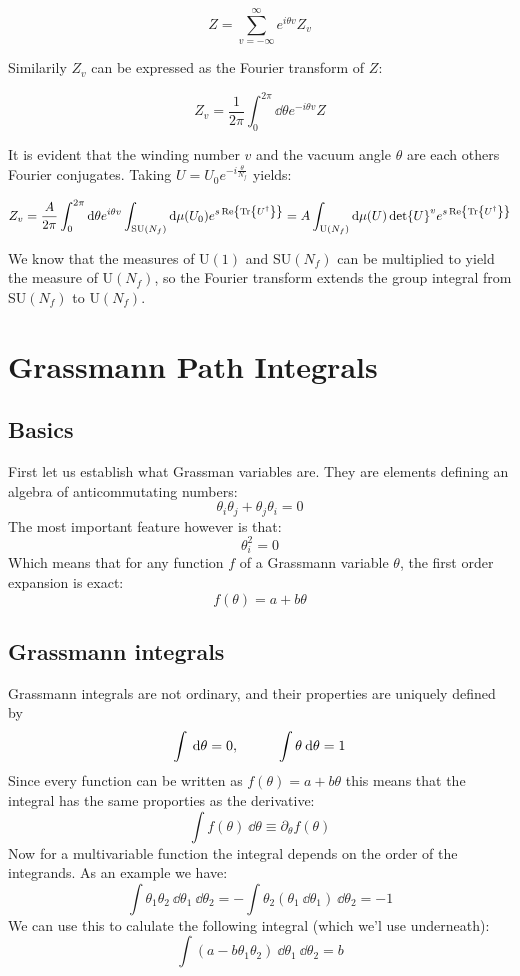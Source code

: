 \documentclass[a4,10pt,titlepage]{article}
\renewcommand\[{\begin{equation*}}
\renewcommand\]{\end{equation*}}
\newcommand{\be}{\begin{equation}}
\newcommand{\ee}{\end{equation}}
\numberwithin{equation}{section}
\newcommand{\lp}{\left}
\newcommand{\rp}{\right}
\begin{document}
\be
Z=\sum_{v=-\infty}^{\infty}e^{i\theta v}Z_v
\ee

Similarily $Z_v$ can be expressed as the Fourier transform of $Z$:

\be
Z_v=\frac{1}{2\pi}\int_0^{2\pi}\dd\theta e^{-i\theta v}Z
\ee

It is evident that the winding number $v$ and the vacuum angle $\theta$ are each others Fourier conjugates. Taking $U=U_0 e^{-i\frac{\theta}{N_f}}$ yields:

\be
Z_v=\frac{A}{2\pi}\int_0^{2\pi}\dd\theta e^{i\theta v}\int_{\text{SU}(N_f)}\dd\mu(U_0)e^{s\Re{\Tr{U^\dagger}}}=A\int_{\text{U}(N_f)}\dd\mu(U)\det{U}^v e^{s\Re{\Tr{U^\dagger}}}
\ee

We know that the measures of U$(1)$ and SU$(N_f)$ can be multiplied to yield the measure of U$(N_f)$, so the Fourier transform extends the group integral from SU$(N_f)$ to U$(N_f)$.
\section{Grassmann Path Integrals}
\subsection{Basics}
First let us establish what Grassman variables are. They are elements defining an algebra of anticommutating numbers:
\be
\theta_i\theta_j+\theta_j\theta_i=0
\ee
The most important feature however is that:
\be
\theta_i^2=0
\ee
Which means that for any function $f$ of a Grassmann variable $\theta$, the first order expansion is exact:
\be
f(\theta)=a+b\theta
\ee
\subsection{Grassmann integrals}
Grassmann integrals are not ordinary, and their properties are uniquely defined by
\be
\int\:\dd \theta=0,\hspace*{1cm}\int \theta \:\dd \theta=1
\ee
Since every function can be written as $f(\theta)=a+b\theta$ this means that the integral has the same proporties as the derivative:
\be
\int f(\theta)\:\dd\theta \equiv \partial_\theta f(\theta)
\ee
Now for a multivariable function the integral depends on the order of the integrands. As an example we have:
\be
\int \theta_1\theta_2 \:\dd \theta_1\:\dd \theta_2=-\int \theta_2\lp( \theta_1 \:\dd \theta_1\rp)\:\dd \theta_2=-1
\ee
We can use this to calulate the following integral (which we'l use underneath):
\be \label{eq:grassmann}
\int \lp(a-b\theta_1\theta_2\rp)\:\dd \theta_1\:\dd \theta_2=b
\ee
\end{document}
